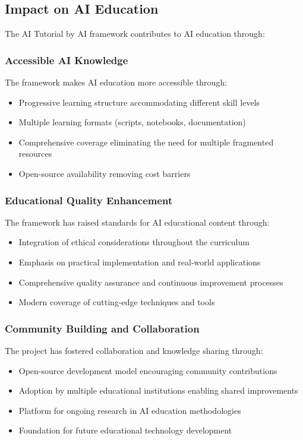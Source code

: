 \subsection{Impact on AI Education}

The AI Tutorial by AI framework contributes to AI education through:

\subsubsection{Accessible AI Knowledge}

The framework makes AI education more accessible through:
\begin{itemize}
    \item Progressive learning structure accommodating different skill levels
    \item Multiple learning formats (scripts, notebooks, documentation)
    \item Comprehensive coverage eliminating the need for multiple fragmented resources
    \item Open-source availability removing cost barriers
\end{itemize}

\subsubsection{Educational Quality Enhancement}

The framework has raised standards for AI educational content through:
\begin{itemize}
    \item Integration of ethical considerations throughout the curriculum
    \item Emphasis on practical implementation and real-world applications
    \item Comprehensive quality assurance and continuous improvement processes
    \item Modern coverage of cutting-edge techniques and tools
\end{itemize}

\subsubsection{Community Building and Collaboration}

The project has fostered collaboration and knowledge sharing through:
\begin{itemize}
    \item Open-source development model encouraging community contributions
    \item Adoption by multiple educational institutions enabling shared improvements
    \item Platform for ongoing research in AI education methodologies
    \item Foundation for future educational technology development
\end{itemize}

